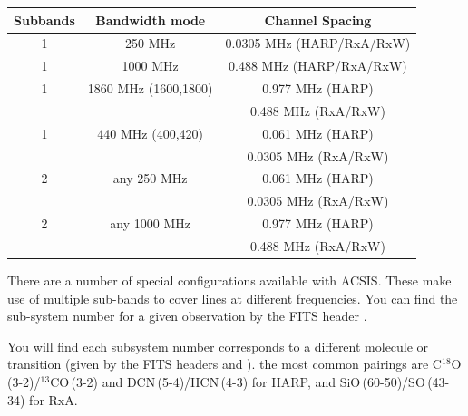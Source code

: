 \documentclass[11pt,oneside,chapters]{starlink}
\begin{document}
\newpage
\begin{table}[h!]
\begin{center}
\begin{tabular}{c|c|c}
\hline
\textbf{Subbands} & \textbf{Bandwidth mode}&	\textbf{Channel Spacing}\\
\hline
1 & 250 MHz &	0.0305 MHz (HARP/RxA/RxW)\\
1 &1000 MHz&	0.488 MHz (HARP/RxA/RxW)\\
1 &1860 MHz (1600,1800) &	0.977 MHz (HARP) \\
 & & 0.488 MHz (RxA/RxW)\\
1 &440  MHz (400,420) &	0.061 MHz (HARP) \\
 & &	 0.0305 MHz (RxA/RxW)\\
\hline
2  & any 250 MHz&	0.061 MHz (HARP)\\
  &&	 0.0305 MHz (RxA/RxW)\\
2 &any 1000 MHz&	0.977 MHz (HARP) \\
 && 0.488 MHz (RxA/RxW)\\
\hline
\end{tabular}
\end{center}
\end{table}
There are a number of special configurations available with ACSIS.
These make use of multiple sub-bands to cover lines at different
frequencies.  You can find the sub-system number for a given
observation by the FITS header .

You will find each subsystem number corresponds to a different
molecule or transition (given by the FITS headers  and
). the most common pairings are
C$^{18}$O\,(3-2)/$^{13}$CO\,(3-2) and DCN\,(5-4)/HCN\,(4-3) for HARP,
and SiO\,(60-50)/SO\,(43-34) for RxA.
\end{document}
